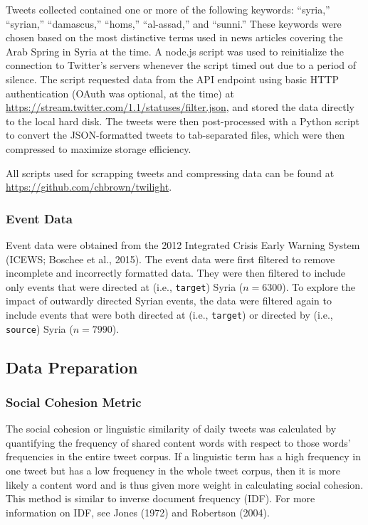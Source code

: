 \documentclass[english,man]{apa6}
\begin{document}
Tweets collected contained one or more of the following keywords:
\enquote{syria,} \enquote{syrian,} \enquote{damascus,} \enquote{homs,} \enquote{al-assad,} and \enquote{sunni.} These
keywords were chosen based on the most distinctive terms used in news
articles covering the Arab Spring in Syria at the time. A node.js script
was used to reinitialize the connection to Twitter's servers whenever the
script timed out due to a period of silence. The script requested data from
the API endpoint using basic HTTP authentication (OAuth was optional, at
the time) at \url{https://stream.twitter.com/1.1/statuses/filter.json}, and stored
the data directly to the local hard disk. The tweets were then post-processed
with a Python script to convert the JSON-formatted tweets to tab-separated
files, which were then compressed to maximize storage efficiency.

All scripts used for scrapping tweets and compressing data can be found at \url{https://github.com/chbrown/twilight}.

\hypertarget{event-data}{%
\subsubsection{Event Data}\label{event-data}}

Event data were obtained from the 2012 Integrated Crisis Early Warning
System (ICEWS; Boschee et al., 2015). The event data were first filtered to
remove incomplete and incorrectly formatted data. They were then filtered
to include only events that were directed at (i.e., \texttt{target}) Syria (\(n = 6300\)).
To explore the impact of outwardly directed Syrian events, the data were
filtered again to include events that were both directed at (i.e., \texttt{target})
or directed by (i.e., \texttt{source}) Syria (\(n = 7990\)).

\hypertarget{data-preparation}{%
\subsection{Data Preparation}\label{data-preparation}}

\hypertarget{social-cohesion-metric}{%
\subsubsection{Social Cohesion Metric}\label{social-cohesion-metric}}

The social cohesion or linguistic similarity of daily tweets was calculated
by quantifying the frequency of shared content words with respect to those
words' frequencies in the entire tweet corpus. If a linguistic term has a
high frequency in one tweet but has a low frequency in the whole tweet
corpus, then it is more likely a content word and is thus given more weight
in calculating social cohesion.
This method is similar to inverse document frequency (IDF).
For more information on IDF, see Jones (1972) and
Robertson (2004).
\end{document}
